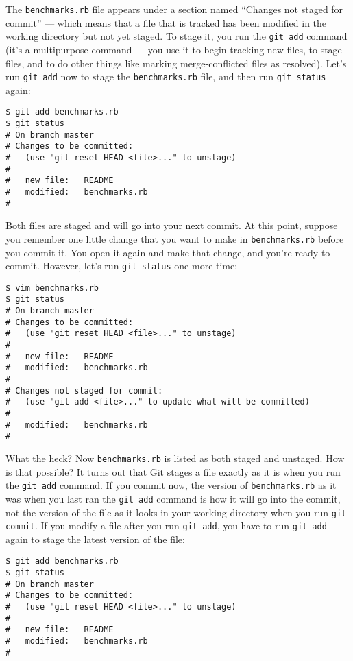 \documentclass[a4paper]{book}
\begin{document}
The \texttt{benchmarks.rb} file appears under a section named “Changes not staged for commit” --- which means that a file that is tracked has been modified in the working directory but not yet staged. To stage it, you run the \texttt{git add} command (it's a multipurpose command --- you use it to begin tracking new files, to stage files, and to do other things like marking merge-conflicted files as resolved). Let's run \texttt{git add} now to stage the \texttt{benchmarks.rb} file, and then run \texttt{git status} again:

\begin{shaded}\begin{verbatim}
$ git add benchmarks.rb
$ git status
# On branch master
# Changes to be committed:
#   (use "git reset HEAD <file>..." to unstage)
#
#	new file:   README
#	modified:   benchmarks.rb
#
\end{verbatim}\end{shaded}

Both files are staged and will go into your next commit. At this point, suppose you remember one little change that you want to make in \texttt{benchmarks.rb} before you commit it. You open it again and make that change, and you're ready to commit. However, let's run \texttt{git status} one more time:

\begin{shaded}\begin{verbatim}
$ vim benchmarks.rb
$ git status
# On branch master
# Changes to be committed:
#   (use "git reset HEAD <file>..." to unstage)
#
#	new file:   README
#	modified:   benchmarks.rb
#
# Changes not staged for commit:
#   (use "git add <file>..." to update what will be committed)
#
#	modified:   benchmarks.rb
#
\end{verbatim}\end{shaded}

What the heck? Now \texttt{benchmarks.rb} is listed as both staged and unstaged. How is that possible? It turns out that Git stages a file exactly as it is when you run the \texttt{git add} command. If you commit now, the version of \texttt{benchmarks.rb} as it was when you last ran the \texttt{git add} command is how it will go into the commit, not the version of the file as it looks in your working directory when you run \texttt{git commit}. If you modify a file after you run \texttt{git add}, you have to run \texttt{git add} again to stage the latest version of the file:

\begin{shaded}\begin{verbatim}
$ git add benchmarks.rb
$ git status
# On branch master
# Changes to be committed:
#   (use "git reset HEAD <file>..." to unstage)
#
#	new file:   README
#	modified:   benchmarks.rb
#
\end{verbatim}\end{shaded}
\end{document}
